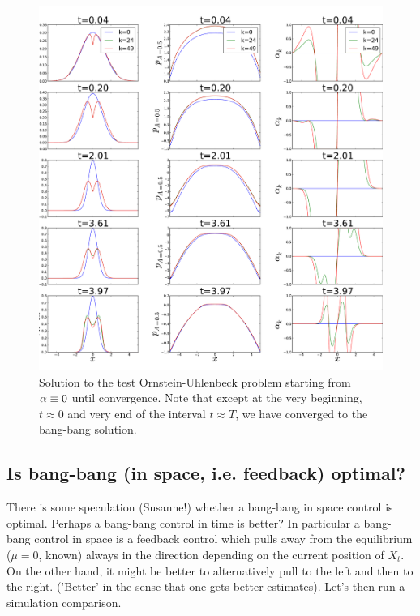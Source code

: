 \documentclass{article}
\begin{document}
\begin{figure}[htp]
\begin{center} 
  \includegraphics[width=.9\textwidth]{Figs/OUFBSolver/FB_alpha_iterates_uICs_5.pdf}
  \caption[labelInTOC]{Solution to the test Ornstein-Uhlenbeck
  problem starting from ${\alpha} \equiv 0$ until convergence. Note that except at the very
  beginning, $t \approx 0$ and very end of the interval $t\approx T$, we have
  converged to the bang-bang solution.}
  \label{fig:FBSoln_OU_alpha_iterations}
\end{center}
\end{figure}


\vskip15pt
\begin{center}

\end{center}

\clearpage

\subsection{Is bang-bang (in space, i.e. feedback) optimal?}
There is some speculation (Susanne!) whether a bang-bang in space control is
optimal. Perhaps a bang-bang control in time is better? In particular a bang-bang control in
space is a feedback control which pulls away from the equilibrium ($\mu=0$,
known) always in the direction depending on the current position of $X_t$. On
the other hand, it might be better to alternatively pull to the left and then to
the right. ('Better' in the sense that one gets better estimates). Let's then
run a simulation comparison. 
\end{document}
